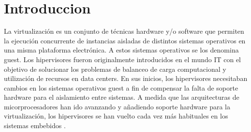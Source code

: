 \chapter{Introduccion}
\label{ch:introduccion:primera}
La virtualización es un conjunto de técnicas hardware y/o software que permiten la ejecución
concurrente de instancias aisladas de distintos sistemas operativos en una misma plataforma
electrónica. A estos sistemas operativos se los denomina guest.
Los hipervisores fueron originalmente introducidos en el mundo IT con el objetivo de solucionar los problemas de
balanceo de carga computacional y utilización de recursos en data centers. En sus inicios, los hipervisores necesitaban cambios en
los sistemas operativos guest a fin de compensar la falta de soporte hardware para el aislamiento
entre sistemas. A medida que las arquitecturas de micorprocesadores han ido avanzando y añadiendo
soporte hardware para la virtualización, los hipervisores se han vuelto cada vez más habituales en los
sistemas embebidos \cite{EmbeddedWorld2018}.

